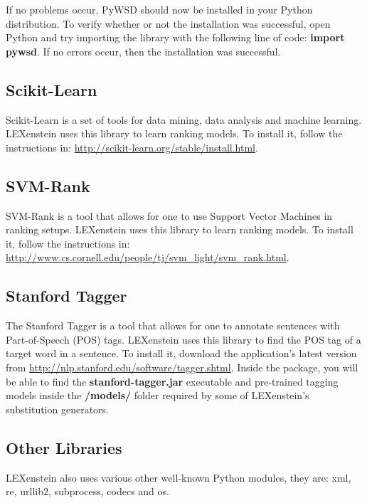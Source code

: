 If no problems occur, PyWSD should now be installed in your Python distribution. To verify whether or not the installation was successful, open Python and try importing the library with the following line of code: \textbf{import pywsd}. If no errors occur, then the installation was successful.






\subsection{Scikit-Learn}

Scikit-Learn \cite{scikit-learn} is a set of tools for data mining, data analysis and machine learning. LEXenstein uses this library to learn ranking models. To install it, follow the instructions in: \url{http://scikit-learn.org/stable/install.html}.



\subsection{SVM-Rank}

SVM-Rank \cite{svmrank} is a tool that allows for one to use Support Vector Machines in ranking setups. LEXenstein uses this library to learn ranking models. To install it, follow the instructions in: \url{http://www.cs.cornell.edu/people/tj/svm_light/svm_rank.html}.


\subsection{Stanford Tagger}

The Stanford Tagger \cite{stanfordparser} is a tool that allows for one to annotate sentences with Part-of-Speech (POS) tags. LEXenstein uses this library to find the POS tag of a target word in a sentence. To install it, download the application's latest version from \url{http://nlp.stanford.edu/software/tagger.shtml}. Inside the package, you will be able to find the \textbf{stanford-tagger.jar} executable and pre-trained tagging models inside the \textbf{/models/} folder required by some of LEXenstein's substitution generators.



\subsection{Other Libraries}

LEXenstein also uses various other well-known Python modules, they are: xml, re, urllib$2$, subprocess, codecs and os.




